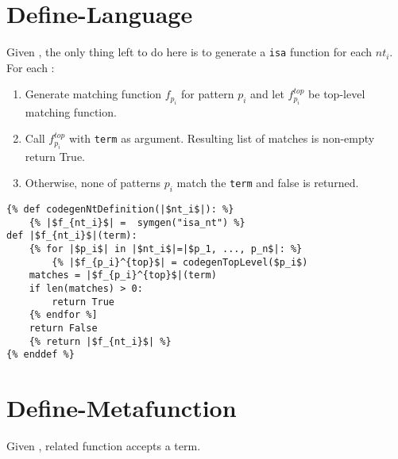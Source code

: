 \section{Define-Language}
Given \DefineLanguage, the only thing left to do here is to generate a \texttt{isa} function for each $nt_i$. For each \NtDefinition:
\begin{enumerate}
\item Generate matching function $f_{p_i}$ for pattern $p_i$ and let $f_{p_i}^{top}$ be top-level matching function. 
\item Call $f_{p_i}^{top}$ with \texttt{term} as argument. Resulting list of matches is non-empty return True. 
\item Otherwise, none of patterns $p_i$ match the \texttt{term} and false is returned.
\end{enumerate}


\begin{verbatim}
{% def codegenNtDefinition(|$nt_i$|): %}
	{% |$f_{nt_i}$| =  symgen("isa_nt") %}
def |$f_{nt_i}$|(term):
	{% for |$p_i$| in |$nt_i$|=|$p_1, ..., p_n$|: %}
		{% |$f_{p_i}^{top}$| = codegenTopLevel($p_i$)
	matches = |$f_{p_i}^{top}$|(term)
	if len(matches) > 0:
		return True
	{% endfor %]
	return False
	{% return |$f_{nt_i}$| %}
{% enddef %}
\end{verbatim}



\section{Define-Metafunction}

Given \DefineMetafunction, related function accepts a term.

